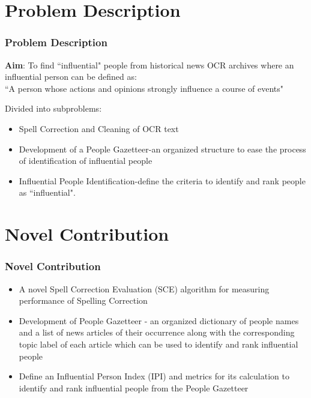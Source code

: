 \documentclass{beamer}
\begin{document}
\section{Problem Description}
\begin{frame}
\frametitle{Problem Description}
\textbf{Aim}: To find ``influential" people from historical news OCR archives where
an influential person can be defined as:\\


``A person whose actions and opinions strongly influence a course of events"\\  \vspace{0.5in}

\pause
Divided into subproblems:
\begin{itemize}
\pause
\item Spell Correction and Cleaning of OCR text
\pause
\item Development of a People Gazetteer-an organized structure to ease the process of identification of influential people
\pause
\item Influential People Identification-define the criteria to identify and rank people as ``influential".
\end{itemize}

\end{frame}


\section{Novel Contribution}
\begin{frame}
\frametitle{Novel Contribution}
\begin{itemize}
\item A novel Spell Correction Evaluation (SCE) algorithm for measuring performance of Spelling Correction
\item Development of People Gazetteer - an organized dictionary of people names and a list of news articles of their occurrence along with the corresponding topic label of each article which can be used to identify and rank influential people
\item Define an Influential Person Index (IPI) and metrics for its calculation to identify and rank influential people from the People Gazetteer
\end{itemize}
\end{frame}


\end{document}

